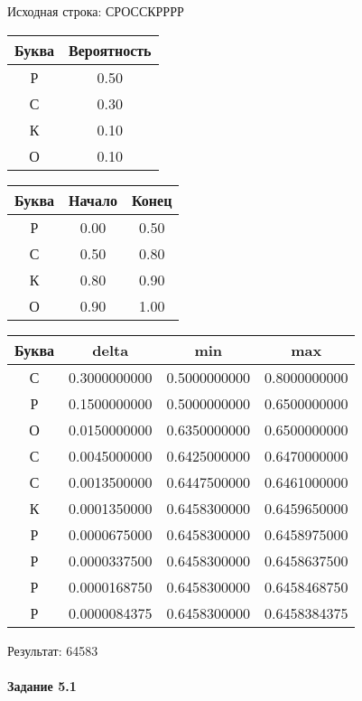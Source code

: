 \documentclass[a4paper, 12pt]{article}
\begin{document}
Исходная строка: СРОССКРРРР\
\begin{center}
 \begin{tabular}{ |c|c| } 
  \hline
     Буква & Вероятность \\ \hline
Р & 0.50\\\hline
С & 0.30\\\hline
К & 0.10\\\hline
О & 0.10
\\ \hline \end{tabular}
\end{center}
\begin{center}
 \begin{tabular}{ |c|c|c| } 
  \hline
     Буква & Начало & Конец \\ \hline
Р & 0.00 & 0.50\\\hline
С & 0.50 & 0.80\\\hline
К & 0.80 & 0.90\\\hline
О & 0.90 & 1.00
\\ \hline \end{tabular}
\end{center}
\begin{center}
 \begin{tabular}{ |c|c|c|c| } 
  \hline
     Буква & delta & min & max \\ \hline
С & 0.3000000000 & 0.5000000000 & 0.8000000000\\\hline
Р & 0.1500000000 & 0.5000000000 & 0.6500000000\\\hline
О & 0.0150000000 & 0.6350000000 & 0.6500000000\\\hline
С & 0.0045000000 & 0.6425000000 & 0.6470000000\\\hline
С & 0.0013500000 & 0.6447500000 & 0.6461000000\\\hline
К & 0.0001350000 & 0.6458300000 & 0.6459650000\\\hline
Р & 0.0000675000 & 0.6458300000 & 0.6458975000\\\hline
Р & 0.0000337500 & 0.6458300000 & 0.6458637500\\\hline
Р & 0.0000168750 & 0.6458300000 & 0.6458468750\\\hline
Р & 0.0000084375 & 0.6458300000 & 0.6458384375
\\ \hline \end{tabular}
\end{center}
Результат: 64583
\pagebreak
\paragraph{Задание 5.1 \\
}
\end{document}
